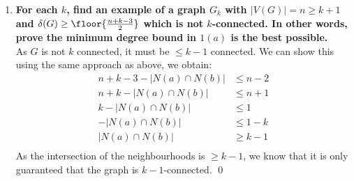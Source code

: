 \begin{enumerate}[label=\textbf{(\alph*)}]
    \boldmath
    \item \textbf{For each $k$, find an example of a graph $G_k$ with $|V(G)| = n \geq k + 1$ and $\delta(G) \geq \floor{\frac{n + k - 3}{2}}$ which is not $k$-connected. In other words, prove the minimum degree bound in $1(a)$ is the best possible.} \\
    \unboldmath
    \linebreak 
    As $G$ is not $k$ connected, it must be $\leq k-1$ connected. We can show this using the same approach as above, we obtain: \\
    \linebreak
    \begin{align*}
    n + k - 3 - |N(a) \cap N(b)| &\leq n - 2 \\ 
    n + k - |N(a) \cap N(b)| &\leq n+1 \\
    k - |N(a) \cap N(b)| &\leq 1 \\
     - |N(a) \cap N(b)| &\leq 1 - k \\
     |N(a) \cap N(b)| &\geq k - 1\\
    \end{align*} 
As the intersection of the neighbourhoods is $\geq k-1$, we know that it is only guaranteed that the graph is $k-1$-connected. \qed 
\end{enumerate}